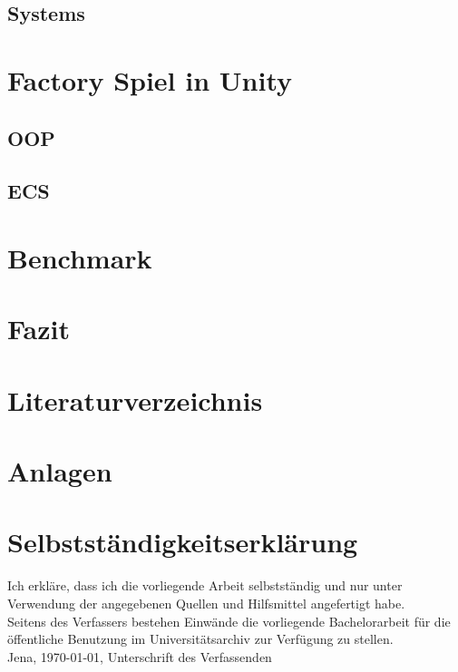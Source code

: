 \documentclass[12pt, titlepage]{article}
\begin{document}
\subsection{Systems}
\newpage
\section{Factory Spiel in Unity}
\subsection{OOP}
\subsection{ECS}
\newpage
\section{Benchmark}
\newpage
\section{Fazit}
\newpage
\section{Literaturverzeichnis}
\newpage
\section{Anlagen}
\newpage
\section{Selbstständigkeitserklärung}
Ich erkläre, dass ich die vorliegende Arbeit selbstständig und nur unter Verwendung der
angegebenen Quellen und Hilfsmittel angefertigt habe.\\
Seitens des Verfassers bestehen Einwände die vorliegende Bachelorarbeit für die öffentliche Benutzung im
Universitätsarchiv zur Verfügung zu stellen.\\
Jena, \today, Unterschrift des Verfassenden
\end{document}
